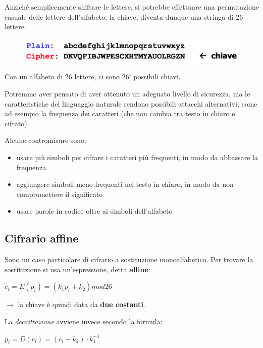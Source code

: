 \noindent Anziché semplicemente shiftare le lettere, si potrebbe effettuare una permutazione casuale delle lettere 
dell'alfabeto; la chiave, diventa dunque una stringa di 26 lettere.

\begin{figure}[H]
    \centering
    \includegraphics[width=0.7\linewidth]{chapters/chap2/images/shift.png}
\end{figure}

\noindent Con un alfabeto di 26 lettere, ci sono $26!$ possibili chiavi.

\noindent Potremmo aver pensato di aver ottenuto un adeguato livello di sicurezza, ma le caratteristiche del linguaggio naturale 
rendono possibili attacchi alternativi, come ad esempio la frequenza dei caratteri (che non cambia tra testo in chiaro e cifrato).

\noindent Alcune contromisure sono:
\begin{itemize}
    \item usare più simboli per cifrare i caratteri più frequenti, in modo da abbassare la frequenza 
    \item aggiungere simboli meno frequenti nel testo in chiaro, in modo da non compromettere il significato 
    \item usare parole in codice oltre ai simboli dell'alfabeto
\end{itemize}

\subsection{Cifrario affine}
Sono un caso particolare di cifrario a sostituzione monoalfabetico. Per trovare la sostituzione si usa un'espressione,
detta \textbf{affine}:

\begin{center}
    $c_i = E(p_i) = (k_1p_i + k_2) mod 26$
\end{center}

$\rightarrow$ la chiave è quindi data da \textbf{due costanti}.

\noindent La \textit{decrittazione} avviene invece secondo la formula:

\begin{center}
    $p_i = D(c_i) = (c_i - k_2) \cdot k_1^{-1}$
\end{center}

